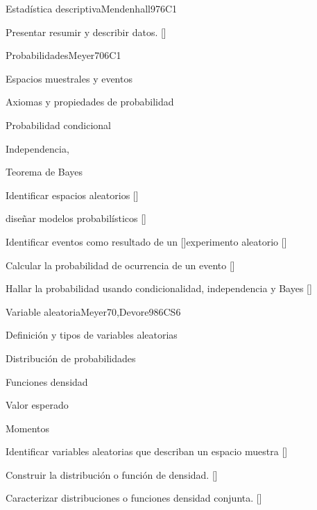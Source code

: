 \begin{syllabus}
\begin{unit}{}{Estadística descriptiva}{Mendenhall97}{6}{C1}
   \begin{learningoutcomes}
      \item Presentar resumir y describir datos. [\Usage]
   \end{learningoutcomes}
\end{unit}

\begin{unit}{}{Probabilidades}{Meyer70}{6}{C1}
\begin{topics}
      \item Espacios muestrales y eventos
      \item Axiomas y propiedades de probabilidad
      \item Probabilidad condicional
      \item Independencia,
      \item Teorema de Bayes
   \end{topics}
   \begin{learningoutcomes}
      \item Identificar espacios aleatorios [\Usage]
      \item diseñar  modelos probabilísticos [\Usage]
      \item Identificar eventos como resultado de un  [\Usage]experimento aleatorio [\Usage]
      \item Calcular la probabilidad de ocurrencia de un evento [\Usage]
      \item Hallar la probabilidad usando condicionalidad, independencia y Bayes [\Usage]
   \end{learningoutcomes}
\end{unit}

\begin{unit}{}{Variable aleatoria}{Meyer70,Devore98}{6}{CS6}
\begin{topics}
      \item Definición y tipos de variables aleatorias 
      \item Distribución de probabilidades
      \item Funciones densidad
      \item Valor esperado
      \item Momentos
   \end{topics}

   \begin{learningoutcomes}
      \item Identificar variables aleatorias que describan un espacio muestra [\Usage]
      \item Construir la distribución o función de densidad. [\Usage]
      \item Caracterizar distribuciones o funciones densidad conjunta. [\Usage]
   \end{learningoutcomes}
\end{unit}


\end{syllabus}
